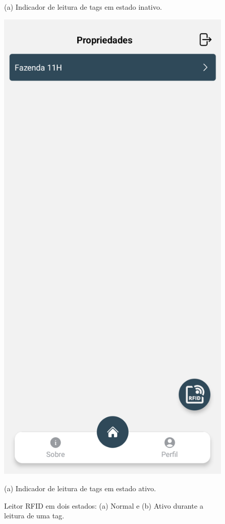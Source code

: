\begin{figure}[H]
\begin{minipage}[b]{0.40\textwidth}
        \caption*{(a) Indicador de leitura de tags em estado inativo.}
    \end{minipage}
    \hspace{5pt}
    \begin{minipage}[b]{0.40\textwidth}
        \centering
        \includegraphics[width=\textwidth]{images/app/rfid-enabled.png}
        \caption*{(a) Indicador de leitura de tags em estado ativo.}
    \end{minipage}
    \hspace{5pt}
    
    \caption{Leitor RFID em dois estados: (a) Normal e (b) Ativo durante a leitura de uma tag.}
    \label{fig:RfidReaderIndicator}
\end{figure}

\newpage
